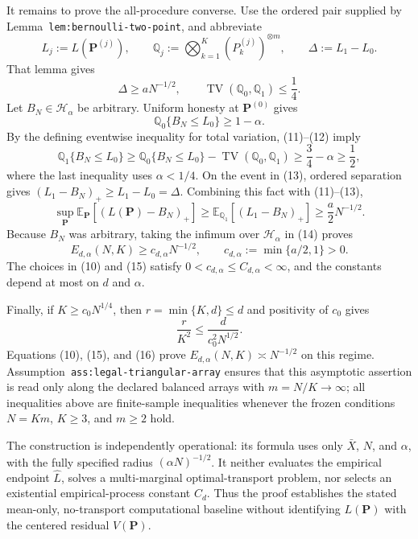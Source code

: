 It remains to prove the all-procedure converse.  Use the ordered pair supplied by Lemma~\texttt{lem:bernoulli-two-point}, and abbreviate
\[
L_j:=L(\mathbf P^{(j)}),
\qquad
\mathbb Q_j:=\bigotimes_{k=1}^{K}(P_k^{(j)})^{\otimes m},
\qquad
\Delta:=L_1-L_0.
\]
That lemma gives
\[
\Delta\ge aN^{-1/2},
\qquad
\operatorname{TV}(\mathbb Q_0,\mathbb Q_1)\le\frac14.                   \tag{11}
\]
Let \(B_N\in\mathcal H_\alpha\) be arbitrary.  Uniform honesty at \(\mathbf P^{(0)}\) gives
\[
\mathbb Q_0\{B_N\le L_0\}\ge1-\alpha.                                  \tag{12}
\]
By the defining eventwise inequality for total variation, (11)--(12) imply
\[
\mathbb Q_1\{B_N\le L_0\}
\ge\mathbb Q_0\{B_N\le L_0\}
   -\operatorname{TV}(\mathbb Q_0,\mathbb Q_1)
\ge\frac34-\alpha
\ge\frac12,                                                              \tag{13}
\]
where the last inequality uses \(\alpha<1/4\).  On the event in (13), ordered separation gives
\(
(L_1-B_N)_+\ge L_1-L_0=\Delta
\).
Combining this fact with (11)--(13),
\[
\sup_{\mathbf P}
\mathbb E_{\mathbf P}[(L(\mathbf P)-B_N)_+]
\ge\mathbb E_{\mathbb Q_1}[(L_1-B_N)_+]
\ge\frac a2N^{-1/2}.                                                      \tag{14}
\]
Because \(B_N\) was arbitrary, taking the infimum over \(\mathcal H_\alpha\) in (14) proves
\[
E_{d,\alpha}(N,K)\ge c_{d,\alpha}N^{-1/2},
\qquad
c_{d,\alpha}:=\min\{a/2,1\}>0.                                          \tag{15}
\]
The choices in (10) and (15) satisfy
\(0<c_{d,\alpha}\le C_{d,\alpha}<\infty\),
and the constants depend at most on \(d\) and \(\alpha\).

Finally, if \(K\ge c_0N^{1/4}\), then \(r=\min\{K,d\}\le d\) and positivity of \(c_0\) gives
\[
\frac r{K^2}
\le \frac d{c_0^2N^{1/2}}.                                               \tag{16}
\]
Equations (10), (15), and (16) prove
\(E_{d,\alpha}(N,K)\asymp N^{-1/2}\)
on this regime.  Assumption~\texttt{ass:legal-triangular-array} ensures that this asymptotic assertion is read only along the declared balanced arrays with \(m=N/K\to\infty\); all inequalities above are finite-sample inequalities whenever the frozen conditions \(N=Km\), \(K\ge3\), and \(m\ge2\) hold.

The construction is independently operational: its formula uses only \(\bar X\), \(N\), and \(\alpha\), with the fully specified radius \((\alpha N)^{-1/2}\).  It neither evaluates the empirical endpoint \(\widehat L\), solves a multi-marginal optimal-transport problem, nor selects an existential empirical-process constant \(C_d\).  Thus the proof establishes the stated mean-only, no-transport computational baseline without identifying \(L(\mathbf P)\) with the centered residual \(V(\mathbf P)\).
